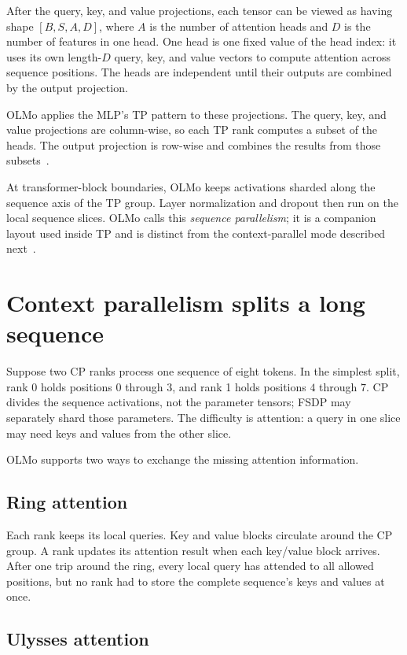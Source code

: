 \documentclass[11pt]{article}
\begin{document}
After the query, key, and value projections, each tensor can be viewed as
having shape \([B,S,A,D]\), where \(A\) is the number of attention heads and
\(D\) is the number of features in one head.  One head is one fixed value of
the head index: it uses its own length-\(D\) query, key, and value vectors to
compute attention across sequence positions.  The heads are independent until
their outputs are combined by the output projection.

OLMo applies the MLP's TP pattern to these projections.  The query, key, and
value projections are column-wise, so each TP rank computes a subset of the
heads.  The output projection is row-wise and combines the results from those
subsets~\cite{olmo-attention}.

At transformer-block boundaries, OLMo keeps activations sharded along the
sequence axis of the TP group. Layer normalization and dropout then run on the
local sequence slices. OLMo calls this \emph{sequence parallelism}; it is a
companion layout used inside TP and is distinct from the context-parallel mode
described next~\cite{olmo-transformer-block}.

\section{Context parallelism splits a long sequence}

Suppose two CP ranks process one sequence of eight tokens. In the simplest
split, rank 0 holds positions \(0\) through \(3\), and rank 1 holds positions
\(4\) through \(7\). CP divides the sequence activations, not the parameter
tensors; FSDP may separately shard those parameters. The difficulty is
attention: a query in one slice may need keys and values from the other slice.

OLMo supports two ways to exchange the missing attention information.

\subsection{Ring attention}

Each rank keeps its local queries. Key and value blocks circulate around the
CP group. A rank updates its attention result when each key/value block
arrives. After one trip around the ring, every local query has attended to all
allowed positions, but no rank had to store the complete sequence's keys and
values at once.

\subsection{Ulysses attention}
\end{document}
